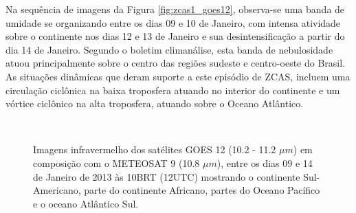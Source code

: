 Na sequência de imagens da Figura \ref{fig:zcas1_goes12}, observa-se uma banda de umidade se organizando entre os dias 09 e 10 de Janeiro, com intensa atividade sobre o continente nos dias 12 e 13 de Janeiro e sua desintensificação a partir do dia 14 de Janeiro. Segundo o boletim climanálise, esta banda de nebulosidade atuou principalmente sobre o centro das regiões sudeste e centro-oeste do Brasil. As situações dinâmicas que deram suporte a este episódio de ZCAS, incluem uma circulação ciclônica na baixa troposfera atuando no interior do continente e um vórtice ciclônico na alta troposfera, atuando sobre o Oceano Atlântico.

\begin{figure}[H]
    \vspace{2mm}
    \caption{Imagens infravermelho dos satélites GOES 12 (10.2 - 11.2 $\mu{m}$) em composição com o METEOSAT 9 (10.8 $\mu{m}$), entre os dias 09 e 14 de Janeiro de 2013 às 10BRT (12UTC) mostrando o continente Sul-Americano, parte do continente Africano, partes do Oceano Pacífico e o oceano Atlântico Sul.}
    \begin{center}
        \\
\end{center}
\end{figure}
